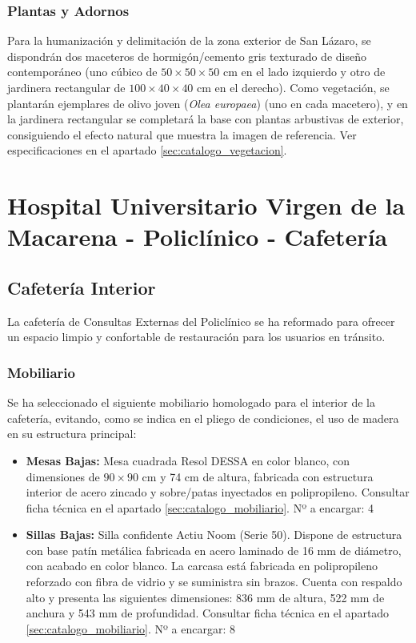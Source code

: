 \documentclass[12pt,a4paper]{article}
\newcommand{\todo}[1]{#1}
\begin{document}
\subsubsection{Plantas y Adornos}
Para la humanización y delimitación de la zona exterior de San Lázaro, se dispondrán dos maceteros de hormigón/cemento gris texturado de diseño contemporáneo (uno cúbico de $50 \times 50 \times 50$ cm en el lado izquierdo y otro de jardinera rectangular de $100 \times 40 \times 40$ cm en el derecho). Como vegetación, se plantarán ejemplares de olivo joven (\textit{Olea europaea}) (uno en cada macetero), y en la jardinera rectangular se completará la base con plantas arbustivas de exterior, consiguiendo el efecto natural que muestra la imagen de referencia. Ver especificaciones en el apartado \ref{sec:catalogo_vegetacion}.


\section{Hospital Universitario Virgen de la Macarena - Policlínico - Cafetería}

\subsection{Cafetería Interior}
La cafetería de Consultas Externas del Policlínico se ha reformado para ofrecer un espacio limpio y confortable de restauración para los usuarios en tránsito.


\subsubsection{Mobiliario}
Se ha seleccionado el siguiente mobiliario homologado para el interior de la cafetería, evitando, como se indica en el pliego de condiciones, el uso de madera en su estructura principal:
\begin{itemize}
    \item \textbf{Mesas Bajas:} Mesa cuadrada Resol DESSA en color blanco, con dimensiones de $90 \times 90$ cm y 74 cm de altura, fabricada con estructura interior de acero zincado y sobre/patas inyectados en polipropileno. Consultar ficha técnica en el apartado \ref{sec:catalogo_mobiliario}. \todo{Nº a encargar: 4}
    \item \textbf{Sillas Bajas:} Silla confidente Actiu Noom (Serie 50). Dispone de estructura con base patín metálica fabricada en acero laminado de 16 mm de diámetro, con acabado en color blanco. La carcasa está fabricada en polipropileno reforzado con fibra de vidrio y se suministra sin brazos. Cuenta con respaldo alto y presenta las siguientes dimensiones: 836 mm de altura, 522 mm de anchura y 543 mm de profundidad. Consultar ficha técnica en el apartado \ref{sec:catalogo_mobiliario}. \todo{Nº a encargar: 8}
\end{itemize}
\end{document}
